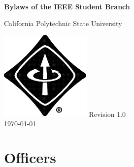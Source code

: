 \documentclass{article}
\begin{document}
\begin{titlepage}
  \begin{center}
    \vspace*{1cm}
    \textbf{\huge{Bylaws of the IEEE Student Branch}}
    
    \vspace{0.5cm}

    \Large{California Polytechnic State University}

    \vspace{1.5cm}

    \includegraphics[width=0.333\textwidth]{ieee_logo.png}
    \vfill
    \large{Revision 1.0}\\
    \today 
  \end{center}
\end{titlepage}


\tableofcontents
\clearpage


\section{Officers}
\end{document}
